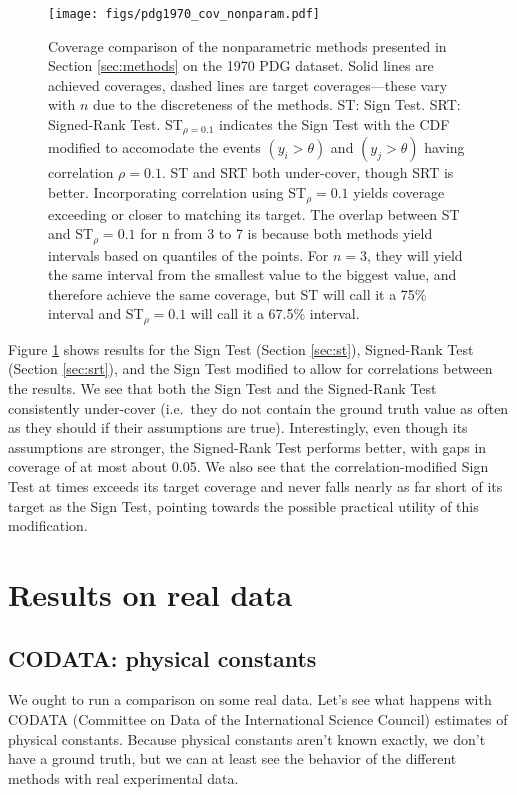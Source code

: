 \documentclass[letterpaper,12pt]{article}
\begin{document}
\begin{figure}[htbp]
  \texttt{[image: figs/pdg1970\_cov\_nonparam.pdf]}
  \caption{
Coverage comparison of the nonparametric methods presented in Section \ref{sec:methods} on the 1970 PDG dataset. Solid lines are achieved coverages, dashed lines are target coverages---these vary with $n$ due to the discreteness of the methods. ST: Sign Test. SRT: Signed-Rank Test. ST$_{\rho=0.1}$ indicates the Sign Test with the CDF modified to accomodate the events $(y_i>\theta)$ and $(y_j>\theta)$ having correlation $\rho=0.1$. ST and SRT both under-cover, though SRT is better. Incorporating correlation using ST$_\rho=0.1$ yields coverage exceeding or closer to matching its target. The overlap between ST and ST$_\rho=0.1$ for n from 3 to 7 is because both methods yield intervals based on quantiles of the points. For $n=3$, they will yield the same interval from the smallest value to the biggest value, and therefore achieve the same coverage, but ST will call it a 75\% interval and ST$_\rho=0.1$ will call it a 67.5\% interval.
}\label{fig:pdg1970-cov-nonparam}
\end{figure}


Figure \ref{fig:pdg1970-cov-nonparam} shows results for the Sign Test (Section \ref{sec:st}), Signed-Rank Test (Section \ref{sec:srt}), and the Sign Test modified to allow for correlations between the results. We see that both the Sign Test and the Signed-Rank Test consistently under-cover (i.e.~they do not contain the ground truth value as often as they should if their assumptions are true). Interestingly, even though its assumptions are stronger, the Signed-Rank Test performs better, with gaps in coverage of at most about 0.05. We also see that the correlation-modified Sign Test at times exceeds its target coverage and never falls nearly as far short of its target as the Sign Test, pointing towards the possible practical utility of this modification.

\section{Results on real data}\label{results-on-real-data}

\subsection{CODATA: physical constants}\label{codata-physical-constants}

We ought to run a comparison on some real data. Let's see what happens with CODATA (Committee on Data of the International Science Council) estimates of physical constants. Because physical constants aren't known exactly, we don't have a ground truth, but we can at least see the behavior of the different methods with real experimental data.
\end{document}
